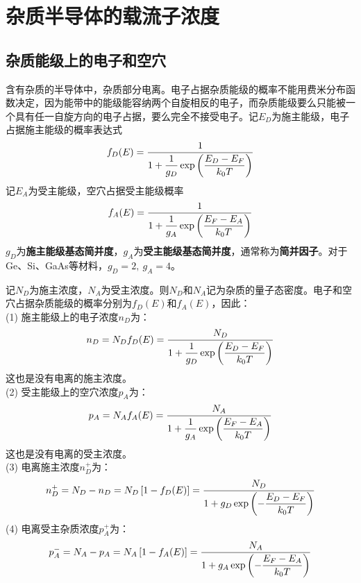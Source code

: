 \section{杂质半导体的载流子浓度}

\subsection{杂质能级上的电子和空穴}

含有杂质的半导体中，杂质部分电离。电子占据杂质能级的概率不能用费米分布函数决定，因为能带中的能级能容纳两个自旋相反的电子，而杂质能级要么只能被一个具有任一自旋方向的电子占据，要么完全不接受电子。记$E_D$为施主能级，电子占据施主能级的概率表达式
\begin{equation}
    f_D(E)=\frac{1}{\displaystyle 1+\frac{1}{g_D}\exp{\left(\frac{E_D-E_F}{k_0T}\right)}}
\end{equation}
记$E_A$为受主能级，空穴占据受主能级概率
\begin{equation}
    f_A(E)=\frac{1}{\displaystyle 1+\frac{1}{g_A}\exp{\left(\frac{E_F-E_A}{k_0T}\right)}}
\end{equation}
$g_D$为\textbf{施主能级基态简并度}，$g_A$为\textbf{受主能级基态简并度}，通常称为\textbf{简并因子}。对于Ge、Si、GaAs等材料，$g_D=2,\ g_A=4$。

记$N_D$为施主浓度，$N_A$为受主浓度。则$N_D$和$N_A$记为杂质的量子态密度。电子和空穴占据杂质能级的概率分别为$f_D(E)$和$f_A(E)$，因此：\vspace{1ex} \\
(1) 施主能级上的电子浓度$n_D$为：
\begin{equation}
    n_D=N_Df_D(E)=\frac{N_D}{\displaystyle 1+\frac{1}{g_D}\exp{\left(\frac{E_D-E_F}{k_0T}\right)}}\label{eq:chap-3-donor-electron-concentration}
\end{equation}
这也是没有电离的施主浓度。\vspace{1ex} \\
(2) 受主能级上的空穴浓度$p_A$为：
\begin{equation}
    p_A=N_Af_A(E)=\frac{N_A}{\displaystyle 1+\frac{1}{g_A}\exp{\left(\frac{E_F-E_A}{k_0T}\right)}}\label{eq:chap-3-acceptor-hole-concentration}
\end{equation}
这也是没有电离的受主浓度。\vspace{1ex} \\
(3) 电离施主浓度$n_D^+$为：
\begin{equation}
    n_D^+=N_D-n_D=N_D\left[1-f_D(E)\right]=\frac{N_D}{\displaystyle 1+g_D\exp{\left(-\frac{E_D-E_F}{k_0T}\right)}}\label{eq:chap-3-ionized-donor-concentration}
\end{equation}
(4) 电离受主杂质浓度$p_A^+$为：
\begin{equation}
    p_A^-=N_A-p_A=N_A\left[1-f_A(E)\right]=\frac{N_A}{\displaystyle 1+g_A\exp{\left(-\frac{E_F-E_A}{k_0T}\right)}}\label{eq:chap-3-ionized-acceptor-concentration}
\end{equation}

